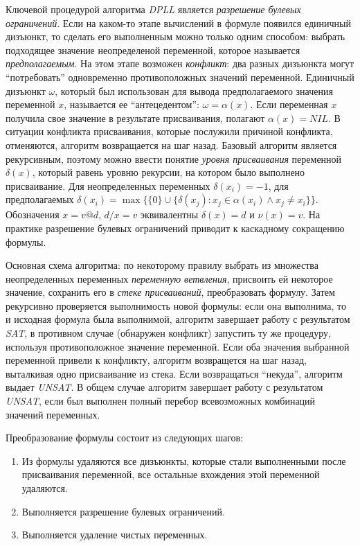 Ключевой процедурой алгоритма \textit{DPLL} является \textit{разрешение булевых ограничений}. 
Если на каком-то этапе вычислений в формуле появился единичный дизъюнкт, то сделать его выполненным можно только одним способом: выбрать подходящее значение неопределеной переменной, которое называется \textit{предполагаемым}. На этом этапе возможен \textit{конфликт}: 
два разных дизъюнкта могут \enquote{потребовать} одновременно противоположных значений переменной. Единичный дизъюнкт $\omega$, 
который был использован для вывода предполагаемого значения переменной $x$, называется ее \enquote{антецедентом}: $\omega = \alpha(x)$. 
Если переменная $x$ получила свое значение в результате присваивания, полагают $\alpha(x) = NIL$.
В ситуации конфликта присваивания, которые послужили причиной конфликта, отменяются, алгоритм возвращается на шаг назад. 
Базовый алгоритм является рекурсивным, поэтому можно ввести понятие \textit{уровня присваивания} переменной $\delta(x)$, который равень уровню рекурсии, на котором было выполнено присваивание. Для неопределенных переменных $\delta(x_i)=-1$, для предполагаемых 
$\delta(x_i) = \max \{ \{0\} \cup \{ \delta(x_j): x_j \in \alpha(x_i) \land x_j \ne x_i \} \}$. 
Обозначения $x = v @ d$, $d/x=v$ эквивалентны $\delta(x) = d$ и $\nu(x) = v$. 
На практике разрешение булевых ограничений приводит к каскадному сокращению формулы. 

Основная схема алгоритма: по некоторому правилу выбрать из множества неопределенных переменных \textit{переменную ветвления}, присвоить ей некоторое значение, сохранить его в \textit{стеке присваиваний}, преобразовать формулу. Затем рекурсивно проверяется выполнимость новой формулы: если она выполнима, то и исходная формула была выполнимой, алгоритм завершает работу с результатом \textit{SAT}, в противном случае (обнаружен конфликт) запустить ту же процедуру, используя противоположное значение переменной. 
Если оба значения выбранной переменной привели к конфликту, алгоритм возвращется на шаг назад, выталкивая одно присваивание из стека. Если возвращаться \enquote{некуда}, алгоритм выдает \textit{UNSAT}. 
В общем случае алгоритм завершает работу с результатом \textit{UNSAT}, если был выполнен полный перебор всевозможных комбинаций значений переменных.

Преобразование формулы состоит из следующих шагов:
\begin{enumerate}
\item
Из формулы удаляются все дизъюнкты, которые стали выполненными после присваивания переменной, 
все остальные вхождения этой переменной удаляются.
\item Выполняется разрешение булевых ограничений.
\item Выполняется удаление чистых переменных.
\end{enumerate}

